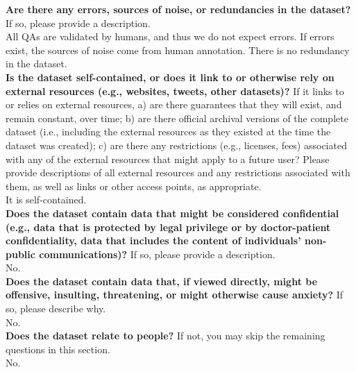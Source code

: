     \textcolor{\sectioncolor}{\textbf{Are there any errors, sources of noise, or redundancies in the dataset?
    }
    If so, please provide a description.
    } \\
    All QAs are validated by humans, and thus we do not expect errors. If errors exist, the sources of noise come from human annotation. There is no redundancy in the dataset. \\
    
    \textcolor{\sectioncolor}{\textbf{Is the dataset self-contained, or does it link to or otherwise rely on
    external resources (e.g., websites, tweets, other datasets)?
    }
    If it links to or relies on external resources, a) are there guarantees
    that they will exist, and remain constant, over time; b) are there official
    archival versions of the complete dataset (i.e., including the external
    resources as they existed at the time the dataset was created); c) are
    there any restrictions (e.g., licenses, fees) associated with any of the
    external resources that might apply to a future user? Please provide
    descriptions of all external resources and any restrictions associated with
    them, as well as links or other access points, as appropriate.
    } \\
    It is self-contained. \\
    
    \textcolor{\sectioncolor}{\textbf{Does the dataset contain data that might be considered confidential (e.g.,
    data that is protected by legal privilege or by doctor-patient
    confidentiality, data that includes the content of individuals’ non-public
    communications)?
    }
    If so, please provide a description.
    } \\
    No. \\
    
    \textcolor{\sectioncolor}{\textbf{Does the dataset contain data that, if viewed directly, might be offensive,
    insulting, threatening, or might otherwise cause anxiety?
    }
    If so, please describe why.
    } \\
    No. \\
    
    \textcolor{\sectioncolor}{\textbf{Does the dataset relate to people?
    }
    If not, you may skip the remaining questions in this section.
    } \\
    No. \\
    

